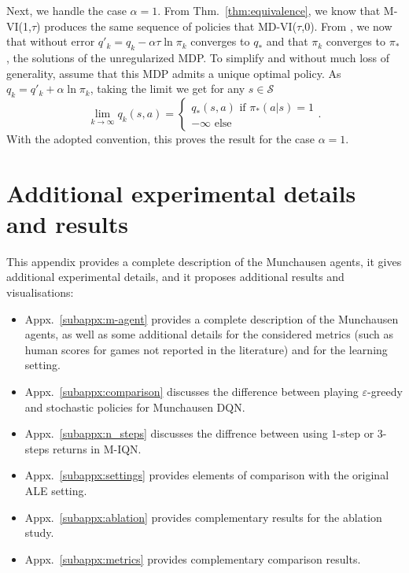 \documentclass{article}
\newcommand{\states}{\mathcal{S}}
\begin{document}
Next, we handle the case $\alpha=1$. From Thm.~\ref{thm:equivalence}, we know that M-VI(1,$\tau$) produces the same sequence of policies that MD-VI($\tau$,$0$). From \cite[Thm.~1]{vieillard2020leverage}, we now that without error $q'_k = q_k -\alpha\tau \ln \pi_k$ converges to $q_*$ and that $\pi_k$ converges to $\pi_*$, the solutions of the unregularized MDP. To simplify and without much loss of generality, assume that this MDP admits a unique optimal policy. As $q_k = q'_k + \alpha \ln \pi_k$, taking the limit we get for any $s\in\states$
\begin{equation}
    \lim_{k\rightarrow\infty} q_k(s,a) = \begin{cases}
        q_*(s,a) \text{ if } \pi_*(a|s) = 1
        \\
        -\infty \text{ else}
    \end{cases}.
\end{equation}
With the adopted convention, this proves the result for the case $\alpha=1$.

\section{Additional experimental details and results}
\label{appx:exp}

This appendix provides a complete description of the Munchausen agents, it gives additional experimental details, and it proposes additional results and visualisations:
\begin{itemize}
    \item Appx.~\ref{subappx:m-agent} provides a complete description of the Munchausen agents, as well as some additional details for the considered metrics (such as human scores for games not reported in the literature) and for the learning setting.
    \item Appx.~\ref{subappx:comparison} discusses the difference between playing $\varepsilon$-greedy and stochastic policies for Munchausen DQN.
    \item Appx.~\ref{subappx:n_steps} discusses the diffrence between using $1$-step or $3$-steps returns in M-IQN.
    \item Appx.~\ref{subappx:settings} provides elements of comparison with the original ALE setting.
    \item Appx.~\ref{subappx:ablation} provides complementary results for the ablation study.
    \item Appx.~\ref{subappx:metrics} provides complementary comparison results.
\end{itemize}
\end{document}
